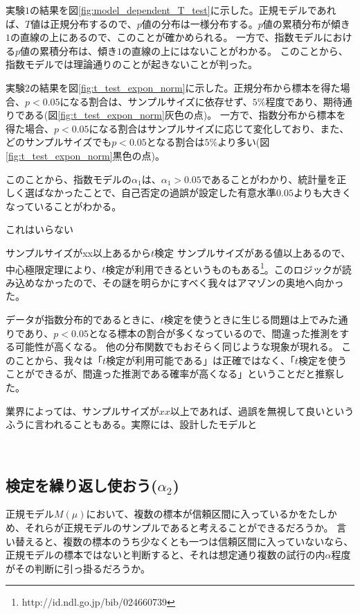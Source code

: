 実験$1$の結果を図\ref{fig:model_dependent_T_test}に示した。正規モデルであれば、$T$値は正規分布するので、$p$値の分布は一様分布する。$p$値の累積分布が傾き$1$の直線の上にあるので、このことが確かめられる。
一方で、指数モデルにおける$p$値の累積分布は、傾き$1$の直線の上にはないことがわかる。
このことから、指数モデルでは理論通りのことが起きないことが判った。

実験$2$の結果を図\ref{fig:t_test_expon_norm}に示した。正規分布から標本を得た場合、$p<0.05$になる割合は、サンプルサイズに依存せず、$5\%$程度であり、期待通りである(図\ref{fig:t_test_expon_norm}灰色の点)。
一方で、指数分布から標本を得た場合、$p<0.05$になる割合はサンプルサイズに応じて変化しており、また、どのサンプルサイズでも$p<0.05$となる割合は$5\%$より多い(図\ref{fig:t_test_expon_norm}黒色の点)。

このことから、指数モデルの$\alpha_1$は、$\alpha_1>0.05$であることがわかり、統計量を正しく選ばなかったことで、自己否定の過誤が設定した有意水準$0.05$よりも大きくなっていることがわかる。

これはいらない
\begin{SMbox}{サンプルサイズがxx以上あるから$t$検定}
        サンプルサイズがある値以上あるので、中心極限定理により、$t$検定が利用できるというものもある\footnote{http://id.ndl.go.jp/bib/024660739}。このロジックが読み込めなかったので、その謎を明らかにすべく我々はアマゾンの奥地へ向かった。

        データが指数分布的であるときに、$t$検定を使うときに生じる問題は上でみた通りであり、$p<0.05$となる標本の割合が多くなっているので、間違った推測をする可能性が高くなる。
        他の分布関数でもおそらく同じような現象が現れる。
        このことから、我々は「$t$検定が利用可能である」は正確ではなく、「$t$検定を使うことができるが、間違った推測である確率が高くなる」ということだと推察した。

        業界によっては、サンプルサイズが$xx$以上であれば、過誤を無視して良いというふうに言われることもある。実際には、設計したモデルと
\end{SMbox}
\fi
　
\subsection{検定を繰り返し使おう($\alpha_2$)}
正規モデル$M(\mu)$において、複数の標本が信頼区間に入っているかをたしかめ、それらが正規モデルのサンプルであると考えることができるだろうか。
言い替えると、複数の標本のうち少なくとも一つは信頼区間に入っていないなら、正規モデルの標本ではないと判断すると、それは想定通り複数の試行の内$\alpha$程度がその判断に引っ掛るだろうか。

